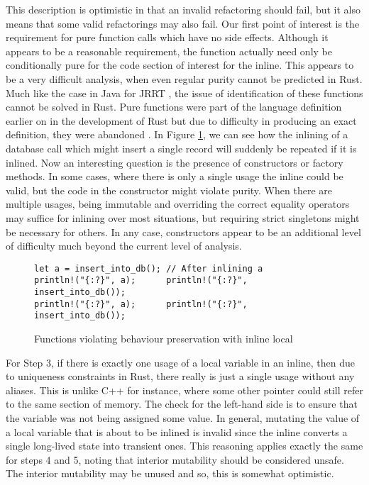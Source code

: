 This description is optimistic in that an invalid refactoring should fail, but it also means that some valid refactorings may also fail. Our first point of interest is the requirement for pure function calls which have no side effects. Although it appears to be a reasonable requirement, the function actually need only be conditionally pure for the code section of interest for the inline. This appears to be a very difficult analysis, when even regular purity cannot be predicted in Rust. Much like the case in Java for JRRT \cite{schafer2010specification}, the issue of identification of these functions cannot be solved in Rust. Pure functions were part of the language definition earlier on in the development of Rust but due to difficulty in producing an exact definition, they were abandoned \cite{pwalton}. In Figure \ref{Fig:funcinline}, we can see how the inlining of a database call which might insert a single record will suddenly be repeated if it is inlined. Now an interesting question is the presence of constructors or factory methods. In some cases, where there is only a single usage the inline could be valid, but the code in the constructor might violate purity. When there are multiple usages, being immutable and overriding the correct equality operators may suffice for inlining over most situations, but requiring strict singletons might be necessary for others. In any case, constructors appear to be an additional level of difficulty much beyond the current level of analysis.

\begin{figure}[h]
\begin{verbatim}
let a = insert_into_db(); // After inlining a
println!("{:?}", a);      println!("{:?}", insert_into_db());
println!("{:?}", a);      println!("{:?}", insert_into_db());
\end{verbatim}
\caption{Functions violating behaviour preservation with inline local}
\label{Fig:funcinline}
\end{figure}

For Step 3, if there is exactly one usage of a local variable in an inline, then due to uniqueness constraints in Rust, there really is just a single usage without any aliases. This is unlike C++ for instance, where some other pointer could still refer to the same section of memory. The check for the left-hand side is to ensure that the variable was not being assigned some value. In general, mutating the value of a local variable that is about to be inlined is invalid since the inline converts a single long-lived state into transient ones. This reasoning applies exactly the same for steps 4 and 5, noting that interior mutability should be considered unsafe. The interior mutability may be unused and so, this is somewhat optimistic.

